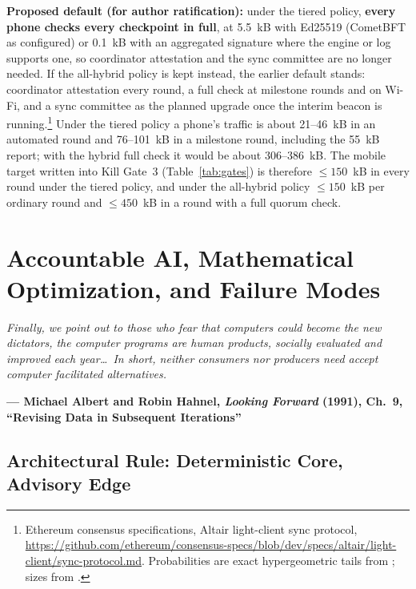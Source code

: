 \documentclass[10pt,twoside,openany]{book}
\theoremstyle{dpepstyle}
\newcommand{\chapterepigraph}[2]{%
  \vspace{-0.4em}
  \begin{FlushRight}
  \begin{minipage}{0.82\textwidth}
    \itshape\small\color{SlateDark} #1\par
    \vspace{3pt}
    \upshape\footnotesize\textbf{--- #2}
  \end{minipage}
  \end{FlushRight}
  \vspace{1em}
}
\newenvironment{FlushRight}{\begin{flushright}}{\end{flushright}}
\begin{document}
\noindent\textbf{Proposed default (for author ratification):} under the tiered policy, \textbf{every phone checks every checkpoint in full}, at 5.5~kB with Ed25519 (CometBFT as configured) or 0.1~kB with an aggregated signature where the engine or log supports one, so coordinator attestation and the sync committee are no longer needed. If the all-hybrid policy is kept instead, the earlier default stands: coordinator attestation every round, a full check at milestone rounds and on Wi-Fi, and a sync committee as the planned upgrade once the interim beacon is running.\footnote{Ethereum consensus specifications, Altair light-client sync protocol, \url{https://github.com/ethereum/consensus-specs/blob/dev/specs/altair/light-client/sync-protocol.md}. Probabilities are exact hypergeometric tails from ; sizes from .} Under the tiered policy a phone's traffic is about 21--46~kB in an automated round and 76--101~kB in a milestone round, including the 55~kB report; with the hybrid full check it would be about 306--386~kB. The mobile target written into Kill Gate~3 (Table~\ref{tab:gates}) is therefore $\le 150$~kB in every round under the tiered policy, and under the all-hybrid policy $\le 150$~kB per ordinary round and $\le 450$~kB in a round with a full quorum check.

\chapter{Accountable AI, Mathematical Optimization, and Failure Modes}
\label{ch:ai}

\chapterepigraph{Finally, we point out to those who fear that computers could become the new dictators, the computer programs are human products, socially evaluated and improved each year\dots\ In short, neither consumers nor producers need accept computer facilitated alternatives.}{Michael Albert and Robin Hahnel, \emph{Looking Forward} (1991), Ch.~9, ``Revising Data in Subsequent Iterations''\protect\footnotemark}

\section{Architectural Rule: Deterministic Core, Advisory Edge}
\end{document}
